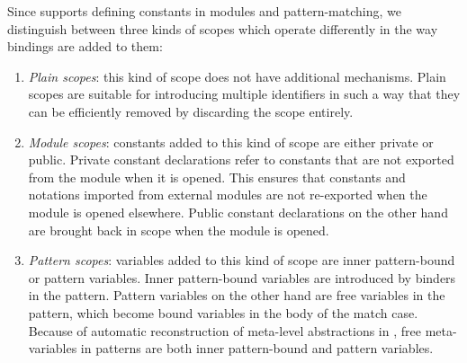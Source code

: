 
Since \Beluga supports defining constants in modules and pattern-matching, we distinguish between three kinds of scopes which operate differently in the way bindings are added to them:
\begin{enumerate}
\item
\textit{Plain scopes}: this kind of scope does not have additional mechanisms.
Plain scopes are suitable for introducing multiple identifiers in such a way that they can be efficiently removed by discarding the scope entirely.
\item
\textit{Module scopes}: constants added to this kind of scope are either private or public.
Private constant declarations refer to constants that are not exported from the module when it is opened.
This ensures that constants and notations imported from external modules are not re-exported when the module is opened elsewhere.
Public constant declarations on the other hand are brought back in scope when the module is opened.
\item
\textit{Pattern scopes}: variables added to this kind of scope are inner pattern-bound or pattern variables.
Inner pattern-bound variables are introduced by binders in the pattern.
Pattern variables on the other hand are free variables in the pattern, which become bound variables in the body of the match case.
Because of automatic reconstruction of meta-level abstractions in \Beluga, free meta-variables in patterns are both inner pattern-bound and pattern variables.
\end{enumerate}






\newcommand{\private}[1]{#1_\downarrow}
\newcommand{\public}[1]{#1_\uparrow}
\newcommand{\Private}[1]{#1_\Downarrow}
\newcommand{\Public}[1]{#1_\Uparrow}
\newcommand{\Env}{\Xi}
\newcommand{\Scope}{\mathbb{S}}
\newcommand{\Module}{\mathbb{M}}
\newcommand{\Pattern}{\mathbb{P}}
\newcommand{\Entry}{\mathbb{E}}
\newcommand{\Var}{\mathbb{V}}
\newcommand{\Constant}{\mathbb{C}}

